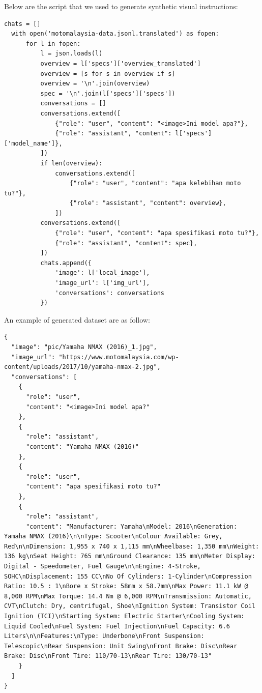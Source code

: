 \documentclass[preprint]{article}
\begin{document}
Below are the script that we used to generate synthetic visual instructions:
\begin{lstlisting}[breaklines=true]
  chats = []
  with open('motomalaysia-data.jsonl.translated') as fopen:
      for l in fopen:
          l = json.loads(l)
          overview = l['specs']['overview_translated']
          overview = [s for s in overview if s]
          overview = '\n'.join(overview)
          spec = '\n'.join(l['specs']['specs'])
          conversations = []
          conversations.extend([
              {"role": "user", "content": "<image>Ini model apa?"},
              {"role": "assistant", "content": l['specs']['model_name']},
          ])
          if len(overview):
              conversations.extend([
                  {"role": "user", "content": "apa kelebihan moto tu?"},
                  {"role": "assistant", "content": overview},
              ])
          conversations.extend([
              {"role": "user", "content": "apa spesifikasi moto tu?"},
              {"role": "assistant", "content": spec},
          ])
          chats.append({
              'image': l['local_image'],
              'image_url': l['img_url'],
              'conversations': conversations
          })
\end{lstlisting}
An example of generated dataset are as follow:
\begin{lstlisting}[breaklines=true]
{
  "image": "pic/Yamaha NMAX (2016)_1.jpg",
  "image_url": "https://www.motomalaysia.com/wp-content/uploads/2017/10/yamaha-nmax-2.jpg",
  "conversations": [
    {
      "role": "user",
      "content": "<image>Ini model apa?"
    },
    {
      "role": "assistant",
      "content": "Yamaha NMAX (2016)"
    },
    {
      "role": "user",
      "content": "apa spesifikasi moto tu?"
    },
    {
      "role": "assistant",
      "content": "Manufacturer: Yamaha\nModel: 2016\nGeneration: Yamaha NMAX (2016)\n\nType: Scooter\nColour Available: Grey, Red\n\nDimension: 1,955 x 740 x 1,115 mm\nWheelbase: 1,350 mm\nWeight: 136 kg\nSeat Height: 765 mm\nGround Clearance: 135 mm\nMeter Display: Digital - Speedometer, Fuel Gauge\n\nEngine: 4-Stroke, SOHC\nDisplacement: 155 CC\nNo Of Cylinders: 1-Cylinder\nCompression Ratio: 10.5 : 1\nBore x Stroke: 58mm x 58.7mm\nMax Power: 11.1 kW @ 8,000 RPM\nMax Torque: 14.4 Nm @ 6,000 RPM\nTransmission: Automatic, CVT\nClutch: Dry, centrifugal, Shoe\nIgnition System: Transistor Coil Ignition (TCI)\nStarting System: Electric Starter\nCooling System: Liquid Cooled\nFuel System: Fuel Injection\nFuel Capacity: 6.6 Liters\n\nFeatures:\nType: Underbone\nFront Suspension: Telescopic\nRear Suspension: Unit Swing\nFront Brake: Disc\nRear Brake: Disc\nFront Tire: 110/70-13\nRear Tire: 130/70-13"
    }
  ]
}
\end{lstlisting}
\end{document}
